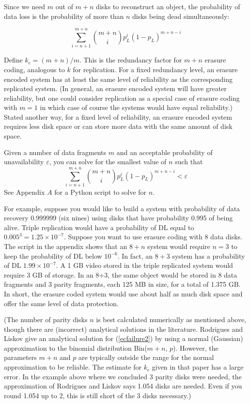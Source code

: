\documentclass[11pt]{article}
\begin{document}
Since we need $m$ out of $m+n$ disks to reconstruct an object, the probability of data loss is the probability of more than $n$ disks being dead simultaneously:

\begin{equation}
\sum_{i=n+1}^{m+n} {m+n \choose i} p_L^i (1-p_L)^{m+n-i} \label{ecfailure1}
\end{equation}

Define $k_c = (m+n)/m$. This is the redundancy factor for $m+n$ erasure coding, analogous to $k$ for replication. For a fixed redundancy level, an erasure encoded system has at least the same level of reliability as the corresponding replicated system. (In general, an erasure encoded system will have greater reliability, but one could consider replication as a special case of erasure coding with $m = 1$ in which case of course the systems would have equal reliability.) Stated another way, for a fixed level of reliability, an erasure encoded system requires less disk space or can store more data with the same amount of disk space.

Given a number of data fragments $m$ and an acceptable probability of unavailability $\varepsilon$, you can solve for the smallest value of $n$ such that
\begin{equation}
\sum_{i=n+1}^{m+n} {m+n \choose i} p_L^i (1-p_L)^{m+n-i} < \varepsilon \label{ecfailure2}
\end{equation}
See Appendix $A$ for a Python script to solve for $n$. 

For example, suppose you would like to build a system with probability of data recovery 0.999999 (six nines) using disks that have probability 0.995 of being alive. Triple replication would have a probability of DL equal to $0.005^3 = 1.25 \times 10^{-7}$. Suppose you want to use erasure coding with 8 data disks. The script in the appendix shows that an $8+n$ system would require $n=3$ to keep the probability of DL below $10^{-6}$. In fact, an $8+3$ system has a probability of DL $1.99 \times 10^{-7}$. A 1 GB video stored in the triple replicated system would require 3 GB of storage. In an 8+3, the same object would be stored in 8 data fragments and 3 parity fragments, each 125 MB in size, for a total of 1.375 GB. In short, the erasure coded system would use about half as much disk space and offer the same level of data protection.

(The number of parity disks $n$ is best calculated numerically as mentioned above, though there are (incorrect) analytical solutions in the literature. Rodrigues and Liskov \cite{rl} give an analytical solution for (\ref{ecfailure2}) by using a normal (Gaussian) approximation to the binomial distribution Bin($m+n$, $p$). However, the parameters $m+n$ and $p$ are typically outside the range for the normal approximation to be reliable. The estimate for $k_c$ given in that paper has a large error. In the example above where we concluded 3 parity disks were needed, the approximation of Rodrigues and Liskov says 1.054 disks are needed. Even if you round 1.054 up to 2, this is still short of the 3 disks necessary.)
\end{document}

